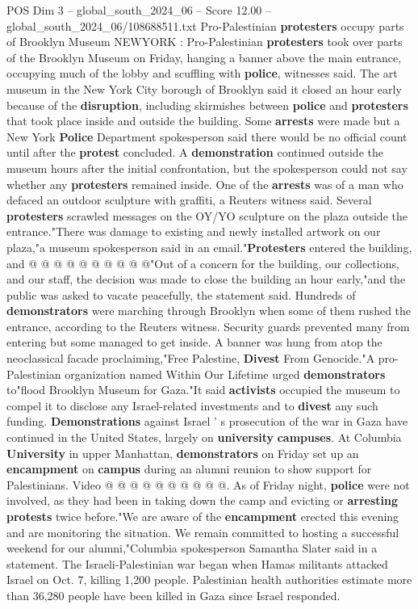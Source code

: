 \begin{textsample}{POS Dim 3 – global\_south\_2024\_06 – Score 12.00 – global\_south\_2024\_06/108688511.txt}  \label{ex:f3_pos_339}
Pro-Palestinian \textbf{protesters} occupy parts of Brooklyn Museum NEWYORK : Pro-Palestinian \textbf{protesters} took over parts of the Brooklyn Museum on Friday, hanging a banner above the main entrance, occupying much of the lobby and scuffling with \textbf{police}, witnesses said.
The art museum in the New York City borough of Brooklyn said it closed an hour early because of the \textbf{disruption}, including skirmishes between \textbf{police} and \textbf{protesters} that took place inside and outside the building.
Some \textbf{arrests} were made but a New York \textbf{Police} Department spokesperson said there would be no official count until after the \textbf{protest} concluded.
A \textbf{demonstration} continued outside the museum hours after the initial confrontation, but the spokesperson could not say whether any \textbf{protesters} remained inside.
One of the \textbf{arrests} was of a man who defaced an outdoor sculpture with graffiti, a Reuters witness said.
Several \textbf{protesters} scrawled messages on the OY/YO sculpture on the plaza outside the entrance."There was damage to existing and newly installed artwork on our plaza,"a museum spokesperson said in an email."\textbf{Protesters} entered the building, and @ @ @ @ @ @ @ @ @ @"Out of a concern for the building, our collections, and our staff, the decision was made to close the building an hour early,"and the public was asked to vacate peacefully, the statement said.
Hundreds of \textbf{demonstrators} were marching through Brooklyn when some of them rushed the entrance, according to the Reuters witness.
Security guards prevented many from entering but some managed to get inside.
A banner was hung from atop the neoclassical facade proclaiming,"Free Palestine, \textbf{Divest} From Genocide."A pro-Palestinian organization named Within Our Lifetime urged \textbf{demonstrators} to"flood Brooklyn Museum for Gaza."It said \textbf{activists} occupied the museum to compel it to disclose any Israel-related investments and to \textbf{divest} any such funding. \textbf{Demonstrations} against Israel ' s prosecution of the war in Gaza have continued in the United States, largely on \textbf{university} \textbf{campuses}.
At Columbia \textbf{University} in upper Manhattan, \textbf{demonstrators} on Friday set up an \textbf{encampment} on \textbf{campus} during an alumni reunion to show support for Palestinians.
Video @ @ @ @ @ @ @ @ @ @.
As of Friday night, \textbf{police} were not involved, as they had been in taking down the camp and evicting or \textbf{arresting} \textbf{protests} twice before."We are aware of the \textbf{encampment} erected this evening and are monitoring the situation.
We remain committed to hosting a successful weekend for our alumni,"Columbia spokesperson Samantha Slater said in a statement.
The Israeli-Palestinian war began when Hamas militants attacked Israel on Oct. 7, killing 1,200 people.
Palestinian health authorities estimate more than 36,280 people have been killed in Gaza since Israel responded.

\end{textsample}
